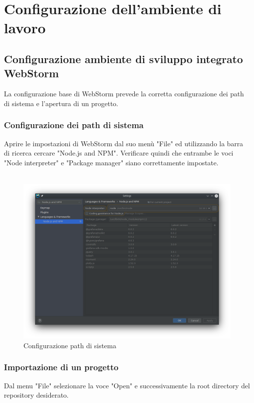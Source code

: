 \section{Configurazione dell'ambiente di lavoro}
\subsection{Configurazione ambiente di sviluppo integrato WebStorm}
La configurazione base di WebStorm prevede la corretta configurazione dei path di sistema e l'apertura di un progetto.
\subsubsection{Configurazione dei path di sistema}
Aprire le impostazioni di WebStorm dal suo menù "File" ed utilizzando la barra di ricerca cercare "Node.js and NPM". Verificare quindi che entrambe le voci "Node interpreter" e "Package manager" siano correttamente impostate.
\\
\\
\begin{figure}[H] 	
	\begin{center}
		\includegraphics[width=\textwidth,height=\textheight,keepaspectratio]{img/node-npm.png}
	\end{center}
	\caption{Configurazione path di sistema}	
\end{figure}
\subsubsection{Importazione di un progetto}
Dal menu "File" selezionare la voce "Open" e successivamente la root directory del repository desiderato.

